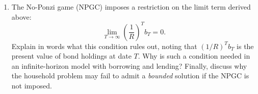 \documentclass[dvipsnames,11pt]{article}
\begin{document}
\begin{enumerate}
\begin{solution}
\textit{Inductive hypothesis}:
\begin{equation*}
    \sum_{t=0}^{T-1}\frac{c_t-w_tn_t}{R^{t+1}}+\frac{b_T}{R^T}=b_0
\end{equation*}
and 
\begin{equation*}
    c_T+b_{T+1}=w_Tn_T+Rb_T \iff b_T = \frac{c_T-w_Tn_T+b_{T+1}}{R}
\end{equation*}
implies 
\begin{gather*}
    \sum_{t=0}^{T-1}\frac{c_t-w_tn_t}{R^{t+1}}+\frac{1}{R^T} \frac{c_T-w_Tn_T+b_{T+1}}{R}=b_0 \\ \iff \\ \sum_{t=0}^T\frac{c_t-w_tn_t}{R^{t+1}}+\frac{b_{T+1}}{R^{T+1}}=b_0 \\ \iff \\ \sum_{t=0}^T\frac{c_t}{R^{t+1}}+\frac{b_{T+1}}{R^{T+1}}=b_0 + \sum_{t=0}^T\frac{w_tn_t}{R^{t+1}}
\end{gather*}
Therefore, by induction (and assuming $\sup_tc_t < \infty, \sup_tw_t < \infty)$, 
\begin{equation*}
    \sum_{t=0}^T\frac{c_t}{R^{t+1}}+\frac{b_{T+1}}{R^{T+1}}=b_0 + \sum_{t=0}^T\frac{w_tn_t}{R^{t+1}} \implies  \sum_{t=0}^\infty\frac{c_t}{R^{t+1}}+\frac{b_{T+1}}{R^{T+1}}=b_0 + \sum_{t=0}^\infty\frac{w_tn_t}{R^{t+1}}.
\end{equation*}
We thereby derive an expression equating the present value of consumption to initial wealth plus the present value of labor income, together with a limit term: 
\begin{equation*}
    \frac{1}{R}\sum_{t=0}^\infty\frac{c_t}{R^{t}}+\lim_{T\to\infty}\Big(\frac{b_T}{R_T}\Big) = b_0+ \frac{1}{R}\sum_{t=0}^\infty\frac{w_tn_t}{R^{t}}.
\end{equation*}
                
            \end{solution}

    
            \item The No-Ponzi game (NPGC) imposes a restriction on the limit term derived above:
            \[
            \lim_{T\to\infty}\left(\frac{1}{R}\right)^T b_T = 0 .
            \]
            Explain in words what this condition rules out, noting that $\left(1/R\right)^T b_T$ is the present value of bond holdings at date $T$. Why is such a condition needed in an infinite-horizon model with borrowing and lending? Finally, discuss why the household problem may fail to admit a \emph{bounded} solution if the NPGC is not imposed.
            

\end{enumerate}
\end{document}
